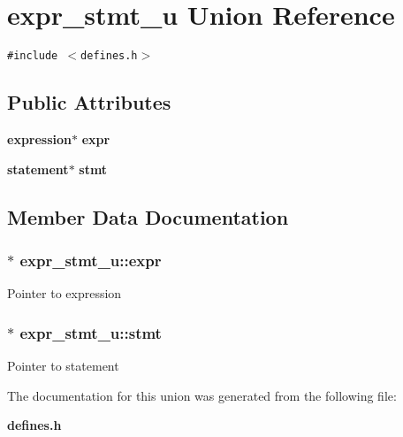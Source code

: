 \section{expr\_\-stmt\_\-u  Union Reference}
\label{unionexpr__stmt__u}
{\tt \#include $<$defines.h$>$}

\subsection*{Public Attributes}
\begin{CompactItemize}
\item 
{\bf expression}$\ast$ {\bf expr}
\item 
{\bf statement}$\ast$ {\bf stmt}
\end{CompactItemize}


\subsection{Member Data Documentation}
\subsubsection{ $\ast$ expr\_\-stmt\_\-u::expr}\label{unionexpr__stmt__u_m0}


Pointer to expression 
\subsubsection{ $\ast$ expr\_\-stmt\_\-u::stmt}\label{unionexpr__stmt__u_m1}


Pointer to statement 

The documentation for this union was generated from the following file:\begin{CompactItemize}
\item 
{\bf defines.h}\end{CompactItemize}
